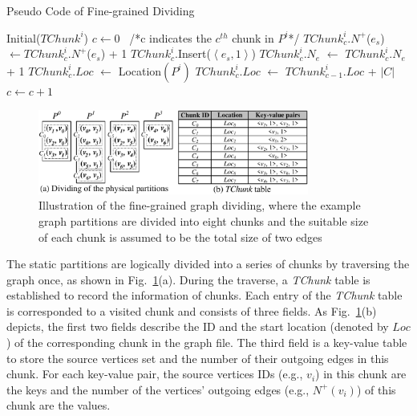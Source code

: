 \documentclass[10pt,journal,compsoc]{IEEEtran}
\begin{document}
\begin{algorithm}[t]
	\caption{Pseudo Code of Fine-grained Dividing}
	\begin{algorithmic}[1]
		\State Initial($TChunk^i$) \label{Initial}
		\State $c \leftarrow 0$ \ /*c indicates the $c^{th}$ chunk in $P^i$*/
		 \label{collect1}
		\State $TChunk^i_c.N^+$($e_s$) $\leftarrow TChunk^i_c.N^+$($e_s$) + 1 \label{ADD_N}
		\Else
		\State $TChunk^i_c.$Insert($\left \langle e_s, 1 \right  \rangle$) \label{Inert}
		\EndIf \label{collect2}
		\State $TChunk^i_c.N_e$ $\leftarrow$ $TChunk^i_c.N_e$ + 1
		 \label{a1_11}
		 \label{location1}
		\State $TChunk^i_c.Loc$ $\leftarrow$ Location$(P^i)$
		\Else
		\State $TChunk^i_c.Loc$ $\leftarrow$ $TChunk^i_{c-1}.Loc$ + $|C|$
		\EndIf \label{location2}
		\State $c \leftarrow c+1$\label{Nextchunk}
		\EndIf
		\EndFor
		\EndProcedure
	\end{algorithmic}
	\label{code1}
\end{algorithm}

\begin{figure}[!t]
	\centering
	\vspace{-0.3cm}
	\includegraphics[width=3.5in]{divide.pdf}
	\vspace{-22pt}
	\caption{Illustration of the fine-grained graph dividing, where the example graph partitions are divided into eight chunks and the suitable size of each chunk is assumed to be the total size of two edges}
	\label{divide}
	\vspace{-14pt}
\end{figure}

The static partitions are logically divided into a series of chunks by traversing the graph once, as shown in Fig.~\ref{divide}(a). During the traverse, a \emph{TChunk} table is established to record the information of chunks. Each entry of the \emph{TChunk} table is corresponded to a visited chunk and consists of three fields. As Fig.~\ref{divide}(b) depicts, the first two fields describe the ID and the start location (denoted by $Loc$) of the corresponding chunk in the graph file. The third field is a key-value table to store the source vertices set and the number of their outgoing edges in this chunk. For each key-value pair, the source vertices IDs (e.g., $v_i$) in this chunk are the keys and the number of the vertices' outgoing edges (e.g., $N^+(v_i)$) of this chunk are the values.
\end{document}
